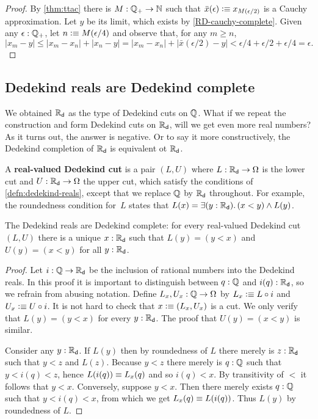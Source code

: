 \begin{proof}
  By \autoref{thm:ttac} there is $M : \mathbb{Q}_{+} \to \mathbb{N}$ such that $\bar{x}(\epsilon) \vcentcolon\equiv
  x_{M(\epsilon/2)}$ is a Cauchy approximation. Let $y$ be its limit, which exists by
  \autoref{RD-cauchy-complete}. Given any $\epsilon : \mathbb{Q}_{+}$, let $n \vcentcolon\equiv M(\epsilon/4)$
  and observe that, for any $m \geq n$,
  \begin{equation*}
    |x_m - y| \leq |x_m - x_n| + |x_n - y| =
    |x_m - x_n| + |\bar{x}(\epsilon/2) - y| <
    \epsilon/4 + \epsilon/2 + \epsilon/4 = \epsilon.
  \end{equation*}
\end{proof}

\subsection{Dedekind reals are Dedekind complete}
\label{sec:RD-dedekind-complete}

We obtained $\mathbb{R}_\mathsf{d}$ as the type of Dedekind cuts on $\mathbb{Q}$. What if we repeat the construction
and form Dedekind cuts on $\mathbb{R}_\mathsf{d}$, will we get even more real numbers? As it turns out, the
answer is negative. Or to say it more constructively, the Dedekind completion of $\mathbb{R}_\mathsf{d}$ is
equivalent ot $\mathbb{R}_\mathsf{d}$.

A \textbf{real-valued Dedekind cut} is a pair $(L, U)$ where $L : \mathbb{R}_\mathsf{d} \to \Omega$ is the
lower cut and $U : \mathbb{R}_\mathsf{d} \to \Omega$ the upper cut, which satisfy the conditions of
\autoref{defn:dedekind-reals}, except that we replace $\mathbb{Q}$ by $\mathbb{R}_\mathsf{d}$ throughout. For
example, the roundedness condition for~$L$ states that $L(x) = \exis{y : \RD} (x < y)
\land L(y)$.

\begin{thm} \label{RD-dedekind-complete}
  The Dedekind reals are Dedekind complete: for every real-valued Dedekind cut $(L, U)$
  there is a unique $x : \mathbb{R}_\mathsf{d}$ such that $L(y) = (y < x)$ and $U(y) = (x < y)$ for all $y :
  \mathbb{R}_\mathsf{d}$.
\end{thm}

\begin{proof}
  Let $i : \mathbb{Q} \to \mathbb{R}_\mathsf{d}$ be the inclusion of rational numbers into the Dedekind reals. In
  this proof it is important to distinguish between $q : \mathbb{Q}$ and $i(q) : \mathbb{R}_\mathsf{d}$, so we
  refrain from abusing notation.
  Define $L_x, U_x : \mathbb{Q} \to \Omega$ by $L_x \vcentcolon\equiv L \circ i$ and $U_x \vcentcolon\equiv U \circ i$.
  It is not hard to check that $x \vcentcolon\equiv (L_x, U_x)$ is a cut. We only verify that $L(y) =
  (y < x)$ for every $y : \mathbb{R}_\mathsf{d}$. The proof that $U(y) = (x < y)$ is similar.

  Consider any $y : \mathbb{R}_\mathsf{d}$. If $L(y)$ then by roundedness of $L$ there merely is $z : \mathbb{R}_\mathsf{d}$
  such that $y < z$ and $L(z)$. Because $y < z$ there merely is $q : \mathbb{Q}$ such that $y <
  i(q) < z$, hence $L(i(q)) \equiv L_x(q)$ and so $i(q) < x$. By transitivity of $<$ it
  follows that $y < x$. Conversely, suppose $y < x$. Then there merely exists $q : \mathbb{Q}$
  such that $y < i(q) < x$, from which we get $L_x(q) \equiv L(i(q))$. Thus $L(y)$ by
  roundedness of $L$.
\end{proof}


